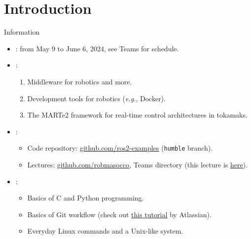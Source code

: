 
\section{Introduction}
\graphicspath{{figs/section1/}}

\begin{frame}{Information}
	\begin{itemize}
		\item {}: from May 9 to June 6, 2024, see Teams for schedule.
		\item {}:
		      \begin{enumerate}
			      \item Middleware for robotics and more.
			      \item Development tools for robotics (\emph{e.g.}, Docker).
			      \item The MARTe2 framework for real-time control architectures in tokamaks.
		      \end{enumerate}
		\item {}:
		      \begin{itemize}
			      \item Code repository: \href{https://github.com/IntelligentSystemsLabUTV/ros2-examples}{\color{blue}\underline{github.com/ros2-examples}} (\texttt{humble} branch).
			      \item Lectures: \href{https://github.com/stars/robmasocco/lists/lectures}{\color{blue}\underline{github.com/robmasocco}}, Teams directory (this lecture is \href{https://github.com/robmasocco/DAFN24_Robotics_1}{\color{blue}\underline{here}}).
		      \end{itemize}
		\item {}:
		      \begin{itemize}
			      \item Basics of C and Python programming.
			      \item Basics of Git workflow (check out \href{https://www.atlassian.com/git/tutorials/what-is-git}{\color{blue}\underline{this tutorial}} by Atlassian).
			      \item Everyday Linux commands and a Unix-like system.
		      \end{itemize}
	\end{itemize}
\end{frame}

